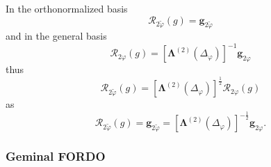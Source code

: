 \documentclass[aps,preprint]{revtex4}%
\begin{document}
In the orthonormalized basis
\begin{equation}
\mathcal{R}_{2\tilde{\varphi}}\left(  g\right)  =\mathbf{g}_{2\tilde{\varphi}}%
\end{equation}
and in the general basis
\begin{equation}
\mathcal{R}_{2\varphi}\left(  g\right)  =\left[  \mathbf{\Lambda}^{\left(
2\right)  }\left(  \Delta_{\varphi}\right)  \right]  ^{-1}\mathbf{g}%
_{2\varphi}%
\end{equation}
thus
\begin{equation}
\mathcal{R}_{2\tilde{\varphi}}\left(  g\right)  =\left[  \mathbf{\Lambda
}^{\left(  2\right)  }\left(  \Delta_{\varphi}\right)  \right]  ^{\frac{1}{2}%
}\mathcal{R}_{2\varphi}\left(  g\right)
\end{equation}
as%
\begin{equation}
\mathcal{R}_{2\tilde{\varphi}}\left(  g\right)  =\mathbf{g}_{2\tilde{\varphi}%
}=\left[  \mathbf{\Lambda}^{\left(  2\right)  }\left(  \Delta_{\varphi
}\right)  \right]  ^{-\frac{1}{2}}\mathbf{g}_{2\varphi}.
\end{equation}


\subsubsection{Geminal FORDO}
\end{document}
